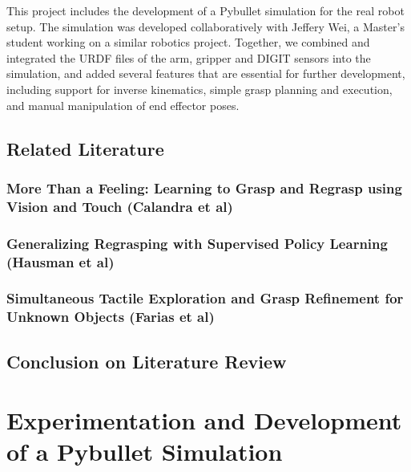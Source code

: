 \documentclass[12pt, a4paper]{report}
\theoremstyle{definition}
\begin{document}
This project includes the development of a Pybullet simulation for the real robot setup. The simulation was developed collaboratively with Jeffery Wei, a Master's student working on a similar robotics project. Together, we combined and integrated the URDF files of the arm, gripper and DIGIT sensors into the simulation, and added several features that are essential for further development, including support for inverse kinematics, simple grasp planning and execution, and manual manipulation of end effector poses.

\section{Related Literature}
\label{}
\subsection{More Than a Feeling: Learning to Grasp and Regrasp using Vision and Touch (Calandra et al)\cite{calandra}}
\label{}


\subsection{Generalizing Regrasping with Supervised Policy Learning (Hausman et al)\cite{hausman}}
\label{}


\subsection{Simultaneous Tactile Exploration and Grasp Refinement for Unknown Objects (Farias et al)\cite{farias}}
\label{}

\section{Conclusion on Literature Review}


\chapter{Experimentation and Development of a Pybullet Simulation}
\label{chap:3}
\end{document}
